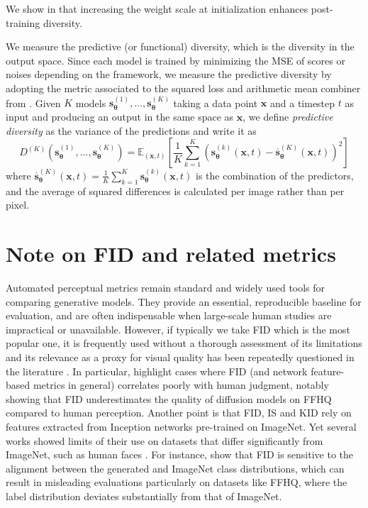 \documentclass[10pt]{article} %
\def\rvx{{\mathbf{x}}}
\def\vtheta{{\bm{\theta}}}
\def\vs{{\bm{s}}}
\begin{document}
We show in  that increasing the weight scale at initialization enhances post-training diversity.

We measure the predictive (or functional) diversity, which is the diversity in the output space. Since each model is trained by minimizing the MSE of scores or noises depending on the framework, we measure the predictive diversity by adopting the metric associated to the squared loss and arithmetic mean combiner from \citet{wood2023unified}. Given $K$ models $\vs_\vtheta^{(1)}, \dots, \vs_\vtheta^{(K)}$ taking a data point $\rvx$ and a timestep $t$ as input and producing an output in the same space as $\rvx$, we define \textit{predictive diversity} as the variance of the predictions and write it as
\begin{equation}\label{eq: diversity score}
D^{(K)}(\vs_\vtheta^{(1)}, \dots, \vs_\vtheta^{(K)}) = \mathbb{E}_{(\rvx,t)}\left[\frac{1}{K}\sum_{k=1}^K (\vs_\vtheta^{(k)}(\rvx,t) - \overline{\vs}_\vtheta^{(K)}(\rvx,t))^2\right]
\end{equation}
where $\overline{\vs}_\vtheta^{(K)}(\rvx,t) = \frac{1}{K} \sum_{k=1}^K \vs_\vtheta^{(k)}(\rvx,t)$ is the combination of the predictors, and the average of squared differences is calculated per image rather than per pixel.


\section{Note on FID and related metrics}\label{app: note fid}

Automated perceptual metrics remain standard and widely used tools for comparing generative models. They provide an essential, reproducible baseline for evaluation, and are often indispensable when large-scale human studies are impractical or unavailable. However, if typically we take FID which is the most popular one, it is frequently used without a thorough assessment of its limitations and its relevance as a proxy for visual quality has been repeatedly questioned in the literature \citep{stein2023exposing,jayasumana2024rethinking, karras2020analyzing, borji2022pros, morozov2021self}. In particular, \citet{stein2023exposing} highlight cases where FID (and network feature-based metrics in general) correlates poorly with human judgment, notably showing that FID underestimates the quality of diffusion models on FFHQ compared to human perception. Another point is that FID, IS and KID rely on features extracted from Inception networks pre-trained on ImageNet. Yet several works showed limits of their use on datasets that differ significantly from ImageNet, such as human faces \citep{borji2022pros,kynkaanniemi2022role}. For instance, \citet{kynkaanniemi2022role} show that FID is sensitive to the alignment between the generated and ImageNet class distributions, which can result in misleading evaluations particularly on datasets like FFHQ, where the label distribution deviates substantially from that of ImageNet.
\end{document}
